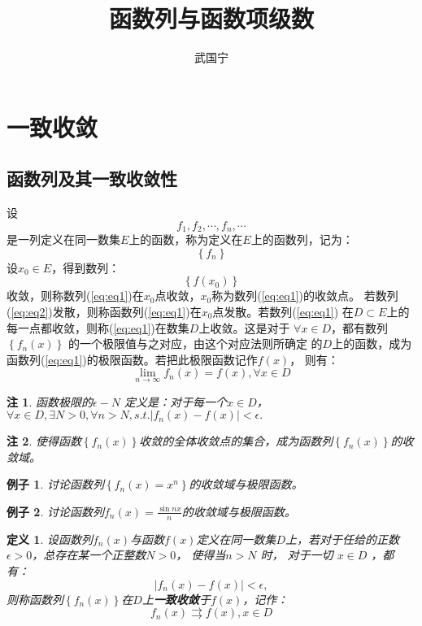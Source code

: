 \documentclass[a4paper,12pt]{article}
\newtheorem{definition}{定义}
\newtheorem{example}{例子}
\newtheorem{remark}{注}
\let\oldref\ref
\renewcommand{\ref}[1]{\rm{(\oldref{#1})}}
\begin{document}
\title{函数列与函数项级数}
\author{武国宁}
\date{}
\maketitle

\section{一致收敛}
\subsection{函数列及其一致收敛性}
设
\begin{equation}
    f_1, f_2, \cdots, f_n, \cdots
    \label{eq:eq1}
\end{equation}
是一列定义在同一数集$E$上的函数，称为定义在$E$上的函数列，记为：
\[
    \left\{f_n\right\}
\]
设$x_0 \in E$，得到数列：
\begin{equation}
    \left\{ f(x_0) \right\} 
    \label{eq:eq2}
\end{equation}
收敛，则称数列\ref{eq:eq1}在$x_0$点收敛，$x_0$称为数列\ref{eq:eq1}的收敛点。
若数列\ref{eq:eq2}发散，则称函数列\ref{eq:eq1}在$x_0$点发散。若数列\ref{eq:eq1}
在$D \subset E$上的每一点都收敛，则称\ref{eq:eq1}在数集$D$上收敛。这是对于
$\forall x \in D$，都有数列$\left\{f_n(x)\right\}$ 的一个极限值与之对应，由这个对应法则所确定
的$D$上的函数，成为函数列\ref{eq:eq1}的极限函数。若把此极限函数记作$f(x)$，
则有：
\[
    \lim_{n \to \infty} f_n(x) = f(x), \forall x \in D
    \]
\begin{remark}
    函数极限的$\epsilon - N$ 定义是：对于每一个$x \in D$，$\displaystyle \forall x \in D,
    \exists N > 0, \forall n > N, s.t. \left| f_n(x) - f(x) \right| < \epsilon.$
\end{remark}
\begin{remark}
    使得函数$\left\{ f_n(x) \right\}$收敛的全体收敛点的集合，成为函数列$\left\{f_n(x)\right\}$的收敛域。
\end{remark}

\begin{example}
    讨论函数列$\left\{f_n(x) = x^n\right\}$的收敛域与极限函数。
\end{example}

\begin{example}
    讨论函数列$f_n(x) = \frac{\sin nx}{n}$的收敛域与极限函数。
\end{example}

\begin{definition}
    设函数列$f_n(x)$与函数$f(x)$定义在同一数集$D$上，若对于任给的正数
    $\epsilon > 0$，总存在某一个正整数$N > 0$， 使得当$n > N$ 时， 对于一切
    $x \in D$ ，都有：
    \[
        \left|f_n(x) - f(x)\right| < \epsilon,
        \]
    则称函数列$\left\{f_n(x)\right\}$在$D$上\textbf{一致收敛}于$f(x)$，记作：
    \[
        f_n(x) \rightrightarrows f(x), x \in D
        \]
\end{definition}
\end{document}
